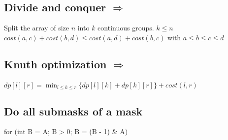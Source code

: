 \subsection{Divide and conquer  $\Rightarrow$  } 
Split the array of size $n$ into $k$ continuous groups. $k \leq n$ \\
$ cost(a, c) + cost(b, d) \leq cost(a, d) + cost(b, c)$ with $a \leq b \leq c \leq d$ \\

\subsection{Knuth optimization  $\Rightarrow$  } 
$ dp[l][r] = \min_{l \leq k \leq r}\{dp[l][k] + dp[k][r]\} + cost(l, r)$ \\
\vspace{-15pt}

\subsection{Do all submasks of a mask}
\begin{code}
for (int B = A; B > 0; B = (B - 1) & A)
\end{code}

